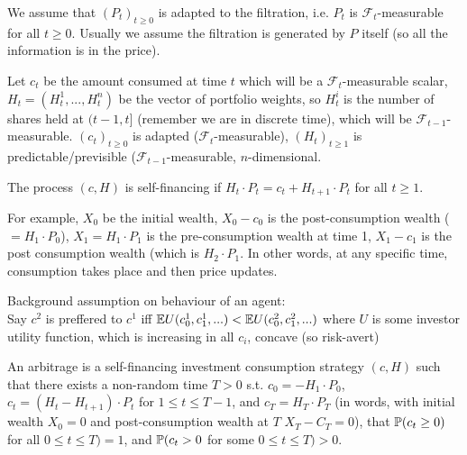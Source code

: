 \documentclass[a4paper]{article}
\begin{document}
We assume that $(P_t)_{t \geq 0}$ is adapted to the filtration, i.e. $P_t$ is $\mathcal{F}_t$-measurable for all $t \geq 0$. Usually we assume the filtration is generated by $P$ itself (so all the information is in the price).

Let $c_t$ be the amount consumed at time $t$ which will be a $\mathcal{F}_t$-measurable scalar, $H_t = (H_t^1,...,H_t^n)$ be the vector of portfolio weights, so $H_t^i$ is the number of shares held at $(t-1,t]$ (remember we are in discrete time), which will be $\mathcal{F}_{t-1}$-measurable. $(c_t)_{t \geq 0}$ is adapted ($\mathcal{F}_t$-measurable), $(H_t)_{t \geq 1}$ is predictable/previsible ($\mathcal{F}_{t-1}$-measurable, $n$-dimensional. 

\begin{defi}
The process $(c,H)$ is self-financing if $H_t\cdot P_t = c_t+H_{t+1} \cdot P_t$ for all $t \geq 1$.
\end{defi}

For example, $X_0$ be the initial wealth, $X_0-c_0$ is the post-consumption wealth ($=H_1 \cdot P_0$), $X_1=H_1 \cdot P_1$ is the pre-consumption wealth at time 1, $X_1-c_1$ is the post consumption wealth (which is $H_2\cdot P_1$. In other words, at any specific time, consumption takes place and then price updates.

Background assumption on behaviour of an agent:\\
Say $c^2$ is preffered to $c^1$ iff $\E U(c_0^1,c_1^1,...) < \E U(c_0^2,c_1^2,...)$ where $U$ is some investor utility function, which is increasing in all $c_i$, concave (so risk-avert)

\begin{defi}
An arbitrage is a self-financing investment consumption strategy $(c,H)$ such that there exists a non-random time $T>0$ s.t. $c_0 = -H_1 \cdot P_0$, $c_t = (H_t - H_{t+1}) \cdot P_t$ for $1 \leq t \leq T-1$, and $c_T =H_T \cdot P_T$ (in words, with initial wealth $X_0 = 0$ and post-consumption wealth at $T$ $X_T-C_T=0$), that $\P(c_t \geq 0)$ for all $0 \leq t \leq T) = 1$, and $\P(c_t > 0$ for some $0 \leq t \leq T) > 0$.
\end{defi}
\end{document}
